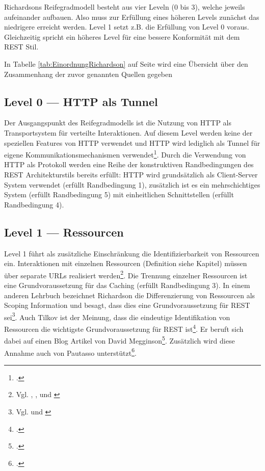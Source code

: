 Richardsons Reifegradmodell besteht aus vier Leveln (0 bis 3), welche jeweils aufeinander aufbauen. Also muss zur Erfüllung eines höheren Levels zunächst das niedrigere erreicht werden. Level 1 setzt z.B. die Erfüllung von Level 0 voraus. Gleichzeitig spricht ein höheres Level für eine bessere Konformität mit dem REST Stil.

In Tabelle \ref{tab:EinordnungRichardson} auf Seite \pageref{tab:EinordnungRichardson} wird eine Übersicht über den Zusammenhang der zuvor genannten Quellen gegeben 

\subsection{Level 0 — HTTP als Tunnel}\label{subsection:level-0}

Der Ausgangspunkt des Reifegradmodells ist die Nutzung von HTTP als Transportsystem für verteilte Interaktionen. Auf diesem Level werden keine der speziellen Features von HTTP verwendet und HTTP wird lediglich als Tunnel für eigene Kommunikationsmechanismen verwendet\footcite[Vgl. ]{fowler_richardson_2010}. Durch die Verwendung von HTTP als Protokoll werden eine Reihe der konstruktiven Randbedingungen des REST Architekturstils bereits erfüllt: HTTP wird grundsätzlich als Client-Server System verwendet (erfüllt Randbedingung 1), zusätzlich ist es ein mehrschichtiges System (erfüllt Randbedingung 5) mit einheitlichen Schnittstellen (erfüllt Randbedingung 4).

\subsection{Level 1 — Ressourcen}\label{subsection:level-1}

Level 1 führt als zusätzliche Einschränkung die Identifizierbarkeit von Ressourcen ein. Interaktionen mit einzelnen Ressourcen (Definition siehe Kapitel) müssen über separate URLs realisiert werden\footnote{Vgl. \cite{fowler_richardson_2010}, \cite[S. 81]{richardson_restful_2007}, \cite{berners-lee_univeral_1996} und \cite[S. 22]{pautasso_rest_2009}}. Die Trennung einzelner Ressourcen ist eine Grundvoraussetzung für das Caching (erfüllt Randbedingung 3). In einem anderen Lehrbuch bezeichnet Richardson die Differenzierung von Ressourcen als Scoping Information und besagt, dass dies eine Grundvoraussetzung für REST sei\footnote{Vgl. \cite[S. 79]{richardson_restful_2007} und \cite[S. 105]{richardson_restful_2007}}. Auch Tilkov ist der Meinung, dass die eindeutige Identifikation von Ressourcen die wichtigste Grundvoraussetzung für REST ist\footcite[Vgl. ][S. 40]{tilkov_rest_2015}. Er beruft sich dabei auf einen Blog Artikel von David Megginson\footcite[Vgl. ]{megginson_rest_2007}. Zusätzlich wird diese Annahme auch von Pautasso unterstützt\footcite[Vgl. ][S. 3]{pautasso_restful_2014}.

